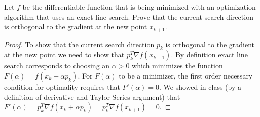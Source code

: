 \documentclass[12pt]{article}
\makeatletter
\theoremstyle{homework}
\newenvironment{exercise}[1]
{\def\@currentlabel{#1}\exercisecore}
{\endexercisecore}
\makeatother
\begin{document}
\vspace{.5in}

\begin{exercise}{5.5} Let $f$ be the differentiable function that is being minimized with an optimization 
  algorithm that uses an exact line search. Prove that the current search direction is orthogonal to the gradient 
  at the new point $x_{k + 1}$.
  \begin{proof} To show that the current search direction $p_k$ is orthogonal to the gradient at the new point we need to show that 
    $p_k^T\nabla f(x_{k + 1})$. By definition exact line search corresponds to choosing an $\alpha > 0$ which minimizes the function 
    $F(\alpha) = f(x_k + \alpha p_k)$. For $F(\alpha)$ to be a minimizer, the first order necessary condition for optimality requires that 
    $F'(\alpha) = 0$. We showed in class (by a definition of derivative and Taylor Series argument) that $F'(\alpha) = p_k^T\nabla f(x_{k} + \alpha p_k) = p_k^T\nabla f(x_{k + 1}) = 0$.
  \end{proof}
  
\end{exercise}
\vspace{.5in}
\end{document}
